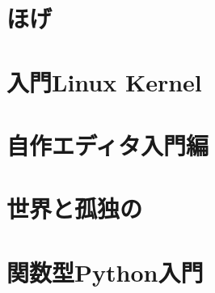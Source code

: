 \documentclass[autodetect-engine,dvipdfmx-if-dvi,ja=standard,a5paper,10.5pt,twoside,openany,layout=v2]{bxjsbook}
\newcommand{\articlepath}{./articles}
\begin{document}
\chapter{ほげ}


\chapter{入門Linux Kernel}


\chapter{自作エディタ入門編}


\chapter{世界と孤独の}


\chapter{関数型Python入門}


\newpage
\myimpression
\end{document}
